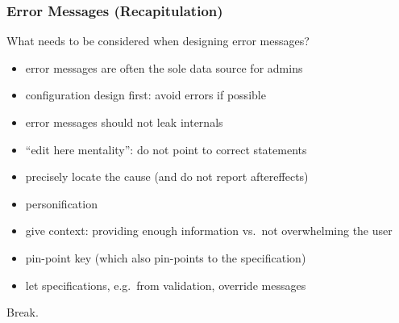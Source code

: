 \begin{frame}
	\frametitle{Error Messages (Recapitulation)}

	\begin{task}
	What needs to be considered when designing error messages?
	\end{task}

	\pause

	\begin{itemize} %
	\item error messages are often the sole data source for admins
	\item configuration design first: avoid errors if possible
	\item error messages should not leak internals~\cite{brown1983error}
	\item ``edit here mentality'': do not point to correct statements~\cite{marceau2011mind}
	\item precisely locate the cause (and do not report aftereffects)
	\item personification~\cite{lee2011personifying}
	\item give context: providing enough information vs.\ not overwhelming the user~\cite{wrenn2017error}

	\item pin-point key (which also pin-points to the specification)
	\item let specifications, e.g.\ from validation, override messages
	\end{itemize}
\end{frame}



\begin{assignment}
	\begin{task}
	Break.
	\end{task}
\end{assignment}



